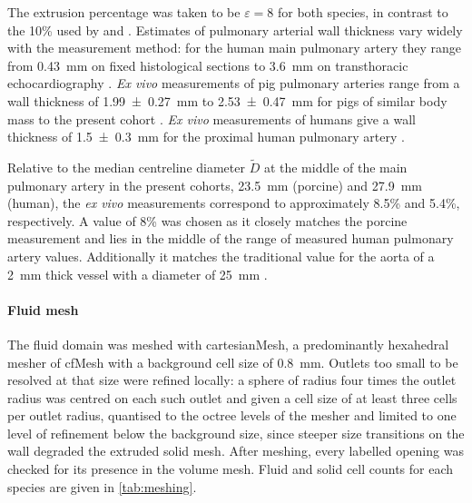 The extrusion percentage was taken to be $\varepsilon = 8$ for both species, in contrast to the 10\% used by \citet{liu2020fluid} and \citet{yangEvolutionHemodynamicForces2019}.
Estimates of pulmonary arterial wall thickness vary widely with the measurement method: for the human main pulmonary artery they range from \SI{0.43}{\milli\metre} on fixed histological sections \citep{mackay1978structural} to \SI{3.6}{\milli\metre} on transthoracic echocardiography \citep{agackiran2023pulmonary}.
\textit{Ex vivo} measurements of pig pulmonary arteries range from a wall thickness of \SI{1.99 \pm 0.27}{\milli\metre} to \SI{2.53 \pm 0.47}{\milli\metre} for pigs of similar body mass to the present cohort \citep{pillalamarriExVivoRegional2021,matthews2010comparison}.
\textit{Ex vivo} measurements of humans give a wall thickness of \SI{1.5 \pm 0.3}{\milli\metre} for the proximal human pulmonary artery \citep{azadani2012biomechanical}.

Relative to the median centreline diameter $\tilde{D}$ at the middle of the main pulmonary artery in the present cohorts, \SI{23.5}{\milli\metre} (porcine) and \SI{27.9}{\milli\metre} (human), the \textit{ex vivo} measurements correspond to approximately 8.5\% and 5.4\%, respectively.
A value of 8\% was chosen as it closely matches the porcine measurement and lies in the middle of the range of measured human pulmonary artery values.
Additionally it matches the traditional value for the aorta of a \SI{2}{\milli\metre} thick vessel with a diameter of \SI{25}{\milli\metre} \citep{burton1954relation}.




\paragraph{Fluid mesh}
The fluid domain was meshed with cartesianMesh, a predominantly hexahedral mesher of cfMesh \citep{juretic2015cfmesh} with a background cell size of \SI{0.8}{\milli\metre}.
Outlets too small to be resolved at that size were refined locally: a sphere of radius four times the outlet radius was centred on each such outlet and given a cell size of at least three cells per outlet radius, quantised to the octree levels of the mesher and limited to one level of refinement below the background size, since steeper size transitions on the wall degraded the extruded solid mesh.
After meshing, every labelled opening was checked for its presence in the volume mesh.
Fluid and solid cell counts for each species are given in \cref{tab:meshing}.

